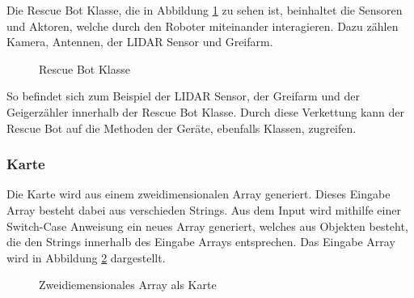 Die Rescue Bot Klasse, die in Abbildung \ref{bot2} zu sehen ist, beinhaltet die Sensoren und Aktoren, welche durch den Roboter miteinander interagieren. Dazu zählen Kamera, Antennen, der LIDAR Sensor und Greifarm.

\begin{figure}[H]
  \caption{Rescue Bot Klasse}
  \label{bot2}
\end{figure}
So befindet sich zum Beispiel der LIDAR Sensor, der Greifarm und der Geigerzähler innerhalb der Rescue Bot Klasse. Durch diese Verkettung kann der Rescue Bot auf die Methoden der Geräte, ebenfalls Klassen, zugreifen. 


\subsubsection{Karte}
\label{map_}
Die Karte wird aus einem zweidimensionalen Array generiert. Dieses Eingabe Array besteht dabei aus verschieden Strings. Aus dem Input wird mithilfe einer Switch-Case Anweisung ein neues Array generiert, welches aus Objekten besteht, die den Strings innerhalb des Eingabe Arrays entsprechen. Das Eingabe Array wird in Abbildung \ref{map} dargestellt. 

\begin{figure}[H]
  \caption{Zweidiemensionales Array als Karte}
  \label{map}
\end{figure}

